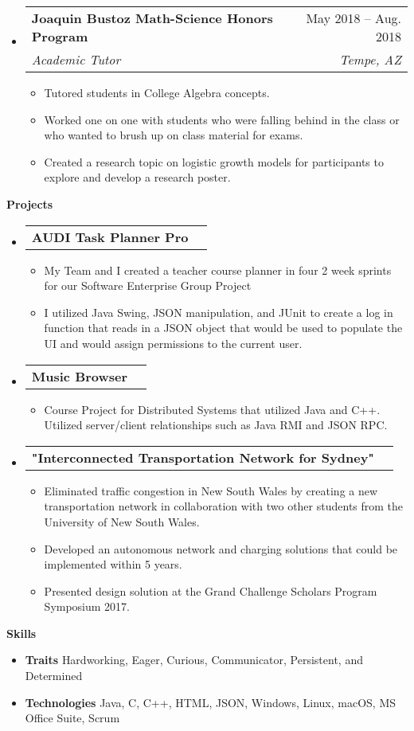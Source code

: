 \documentclass[letterpaper,12pt]{article}[leftmargin=*]
\makeatletter
\def \entryspacing {-0pt}
\renewcommand{\section}[2]{\vspace{5pt}
  \colorbox{secondary}{\color{white}\raggedbottom\normalsize\textbf{{#1}{\hspace{7pt}#2}}}
}
\newcommand{\resumeEntryStart}{\begin{itemize}[leftmargin=2.5mm]}
\newcommand{\resumeEntryEnd}{\end{itemize}\vspace{\entryspacing}}
\newcommand{\resumeItemListStart}{\begin{itemize}[leftmargin=4.5mm]}
\newcommand{\resumeItemListEnd}{\end{itemize}}
\newcommand{\resumeItem}[1]{
  \item\small{
    {#1 \vspace{-2pt}}
  }
}
\newcommand{\resumeEntryTSDL}[4]{
  \vspace{-1pt}\item[]
    \begin{tabularx}{0.97\textwidth}{X@{\hspace{60pt}}r}
      \textbf{\color{primary}#1} & {\firabook\color{accent}\small#2} \\
      \textit{\color{accent}\small#3} & \textit{\color{accent}\small#4} \\
    \end{tabularx}\vspace{-6pt}
}
\newcommand{\resumeEntryTD}[2]{
  \vspace{-1pt}\item[]
    \begin{tabularx}{0.97\textwidth}{X@{\hspace{60pt}}r}
      \textbf{\color{primary}#1} & {\firabook\color{accent}\small#2} \\
    \end{tabularx}\vspace{-6pt}
}
\newcommand{\resumeEntryS}[2]{
  \item[]\small{
    \textbf{\color{primary}#1 }{ #2 \vspace{-6pt}}
  }
}
\makeatother
\begin{document}
  \resumeEntryStart
    \resumeEntryTSDL
      {Joaquin Bustoz Math-Science Honors Program}{May 2018 -- Aug. 2018}
      {Academic Tutor}{Tempe, AZ}
    \resumeItemListStart
        \resumeItem {Tutored students in College Algebra concepts.}
        \resumeItem {Worked one on one with students who were falling behind in the class or who wanted to brush up on class material for exams.}
        \resumeItem {Created a research topic on logistic growth models for participants to explore and develop a research poster.}
    \resumeItemListEnd
  \resumeEntryEnd


\section{\faFlask}{Projects}

  \resumeEntryStart
    \resumeEntryTD
      {AUDI Task Planner Pro}{}
    \resumeItemListStart
      \resumeItem {My Team and I created a teacher course planner in four 2 week sprints  for our Software Enterprise Group Project }
      \resumeItem {I utilized Java Swing, JSON manipulation, and JUnit to create a log in function that reads in a JSON object that would be used to populate the UI and would assign permissions to the current user. }
    \resumeItemListEnd
  \resumeEntryEnd

  \resumeEntryStart
    \resumeEntryTD
      {Music Browser}{}
    \resumeItemListStart
      \resumeItem {Course Project for Distributed Systems that utilized Java and C++. Utilized server/client relationships such as Java RMI and JSON RPC. }
    \resumeItemListEnd
  \resumeEntryEnd

  \resumeEntryStart
    \resumeEntryTD
      {"Interconnected Transportation Network for Sydney"}{}
    \resumeItemListStart
      \resumeItem {Eliminated traffic congestion in New South Wales by creating a new transportation network in collaboration with two other students from the University of New South Wales.}
            \resumeItem {Developed an autonomous network and charging solutions that could be implemented within 5 years.}
                  \resumeItem {Presented design solution at the Grand Challenge Scholars Program Symposium 2017.}
    \resumeItemListEnd
  \resumeEntryEnd

\section{\faGears}{Skills}
 \resumeEntryStart
  \resumeEntryS{Traits } {Hardworking, Eager, Curious, Communicator, Persistent,  and Determined }
  \resumeEntryS{Technologies } {Java, C, C++, HTML, JSON,  Windows, Linux, macOS, MS Office Suite, Scrum}
 \resumeEntryEnd
\end{document}
